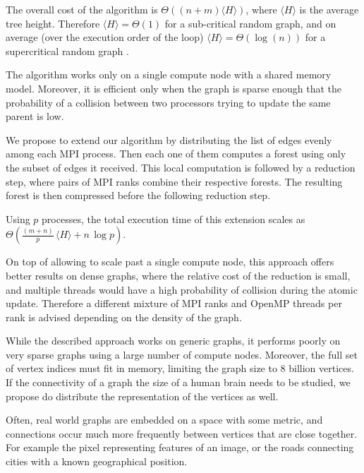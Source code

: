 The overall cost of the algorithm is $\Theta((n +
m)\langle H \rangle)$, where $\langle H \rangle$
is the average tree height. Therefore $\langle H \rangle = \Theta(1)$ for a sub-critical random graph,
and on average (over the execution order of the loop) $\langle H
\rangle = \Theta(\log(n))$
for a supercritical random graph \cite{RandomGraph}.

The algorithm \label{algorithm:cc2} works only on a single compute node with a shared memory model.
Moreover, it is efficient
only when the graph is sparse enough that the
probability of a collision between two processors
trying to update the same parent is low.

We propose to extend our algorithm by distributing the list of edges evenly among each MPI
process. %
Then each one of them computes a forest using only the subset of edges it
received. This local
computation
is followed by a reduction step, where pairs of MPI ranks combine their respective
forests.
The resulting forest is then compressed before the following reduction step.

Using $p$ processes, the total execution time of this extension scales as $\Theta(\frac{(m +
n)}{p}\, \langle H \rangle + n\,\log p)$.

On top of allowing to scale past a single compute node, this approach offers better results on
dense graphs, where the relative cost of the reduction is small, and multiple threads would have
a high probability of collision during the atomic update.
Therefore a different mixture of MPI ranks and OpenMP threads per rank is advised depending on the
density of the graph.

\label{section:distributed}
While the described approach works on generic graphs, it performs poorly on very sparse graphs using
a large number of compute nodes. Moreover, the full set of vertex indices must fit in memory, limiting
the graph size to $8$ billion vertices. If the connectivity of a graph the size of a human brain needs
to be studied,
we propose do distribute the representation of the vertices as well.

Often, real world graphs are embedded on a space with some metric, and connections
occur much more frequently between
vertices that are close together. For example the pixel representing features of an
image, or the roads connecting cities
with a known geographical position.

